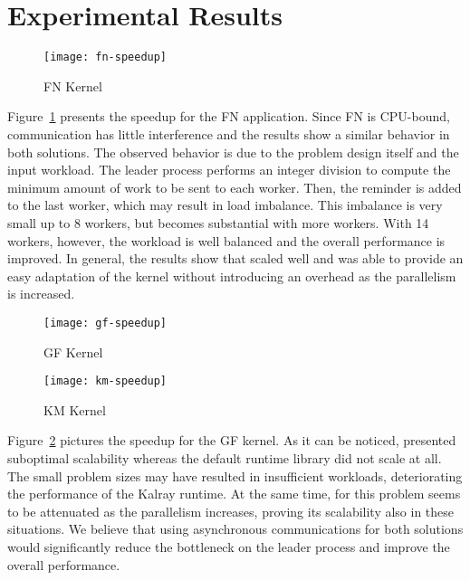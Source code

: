 \section{Experimental Results}
\label{sec:experimental-results}

	\begin{figure}[b]
		\centering
		\texttt{[image: fn-speedup]}
		\caption{FN Kernel}
		\label{figure:fn}
	\end{figure}

	Figure~\ref{figure:fn} presents the speedup for the FN application.
	Since FN is CPU-bound, communication has little interference and
	the results show a similar behavior in both solutions.
	The observed behavior is due to the problem design itself and the input workload.
	The leader process performs an integer division to compute the minimum amount
	of work to be sent to each worker. Then, the reminder is added to the last worker,
	which may result in load imbalance. This imbalance is very small up to 8 workers,
	but becomes substantial with more workers. With 14 workers, however, the workload
	is well balanced and the overall performance is improved.
	In general, the results show that \lwmpi scaled well and was able to provide an
	easy adaptation of the kernel without introducing an overhead as the parallelism is
	increased.

	\begin{figure}[t]
		\centering
		\texttt{[image: gf-speedup]}
		\caption{GF Kernel}
		\label{figure:gf}
		\vspace{-10pt}
	\end{figure}

	\begin{figure}[t]
		\centering
		\texttt{[image: km-speedup]}
		\caption{KM Kernel}
		\label{figure:km}
		\vspace{-15pt}
	\end{figure}

	Figure~\ref{figure:gf} pictures the speedup for the GF kernel.
	As it can be noticed, \lwmpi presented suboptimal scalability whereas
	the default runtime library did not scale at all.
	The small problem sizes may have resulted in insufficient workloads,
	deteriorating the performance of the Kalray runtime.
	At the same time, for \lwmpi this problem seems to be attenuated as
	the parallelism increases, proving its scalability also in these
	situations.
	We believe that using asynchronous communications for both
	solutions would significantly reduce the bottleneck on the leader process
	and improve the overall performance.

